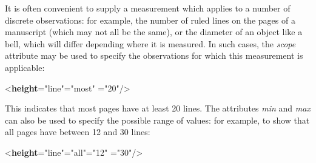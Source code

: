 It is often convenient to supply a measurement which applies to a number of discrete observations: for example, the number of ruled lines on the pages of a manuscript (which may not all be the same), or the diameter of an object like a bell, which will differ depending where it is measured. In such cases, the {\itshape scope} attribute may be used to specify the observations for which this measurement is applicable: \par\bgroup{}\exampleFont \begin{shaded}\noindent\mbox{}{<\textbf{height}\hspace*{1em}{unit}="{line}"\hspace*{1em}{scope}="{most}"\mbox{}\newline 
\hspace*{1em}{atLeast}="{20}"/>}\end{shaded}\egroup\par \noindent  This indicates that most pages have at least 20 lines. The attributes {\itshape min} and {\itshape max} can also be used to specify the possible range of values: for example, to show that all pages have between 12 and 30 lines: \par\bgroup{}\exampleFont \begin{shaded}\noindent\mbox{}{<\textbf{height}\hspace*{1em}{unit}="{line}"\hspace*{1em}{scope}="{all}"\hspace*{1em}{min}="{12}"\mbox{}\newline 
\hspace*{1em}{max}="{30}"/>}\end{shaded}\egroup\par \par
